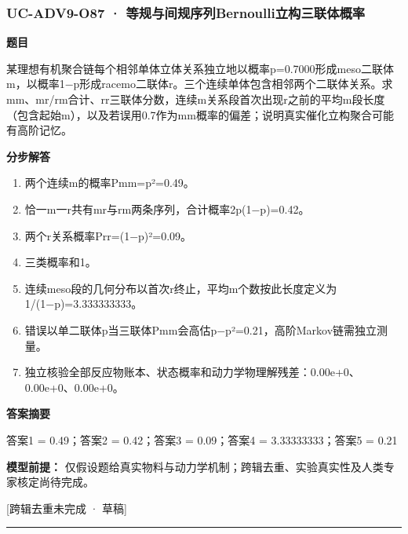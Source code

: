 \documentclass[UTF8,11pt,a4paper]{ctexart}
\begin{document}
\subsubsection*{UC-ADV9-O87 · 等规与间规序列Bernoulli立构三联体概率}
\noindent\textbf{题目}\par
某理想有机聚合链每个相邻单体立体关系独立地以概率p=0.7000形成meso二联体m，以概率1−p形成racemo二联体r。三个连续单体包含相邻两个二联体关系。求mm、mr/rm合计、rr三联体分数，连续m关系段首次出现r之前的平均m段长度（包含起始m），以及若误用0.7作为mm概率的偏差；说明真实催化立构聚合可能有高阶记忆。\par
\medskip\noindent\textbf{分步解答}
\begin{enumerate}
\item 两个连续m的概率Pmm=p²=0.49。
\item 恰一m一r共有mr与rm两条序列，合计概率2p(1−p)=0.42。
\item 两个r关系概率Prr=(1−p)²=0.09。
\item 三类概率和1。
\item 连续meso段的几何分布以首次r终止，平均m个数按此长度定义为1/(1−p)=3.333333333。
\item 错误以单二联体p当三联体Pmm会高估p−p²=0.21，高阶Markov链需独立测量。
\item 独立核验全部反应物账本、状态概率和动力学物理解残差：0.00e+0、0.00e+0、0.00e+0。
\end{enumerate}
\noindent\textbf{答案摘要}\par
答案1 = 0.49；答案2 = 0.42；答案3 = 0.09；答案4 = 3.33333333；答案5 = 0.21\par
\noindent\textbf{模型前提：}
仅假设题给真实物料与动力学机制；跨辑去重、实验真实性及人类专家核定尚待完成。\par
\noindent\textcolor{red!65!black}{[跨辑去重未完成 · 草稿]} \par
\medskip\hrule\medskip
{}
\end{document}
